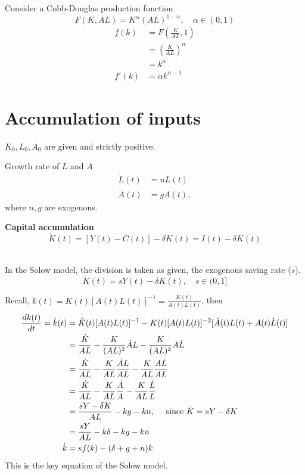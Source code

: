 \documentclass[12pt]{article}
\begin{document}
Consider a Cobb-Douglas production function
\begin{equation*}
F(K,AL) = K^{\alpha}(AL)^{1 - \alpha}, \quad \alpha \in (0,1)
\end{equation*}
\begin{align*}
f(k)&= F \left( \frac{K}{AL}, 1 \right) \\
&= \left( \frac{K}{AL} \right) ^{\alpha}\\
&= k ^{\alpha}\\
f'(k)&= \alpha k ^{\alpha - 1}
\end{align*}




\section{Accumulation of inputs}
$ K_0, L_0, A_0 $ are given and strictly positive.

Growth rate of $ L $ and $ A $
\begin{align*}
\dot{L}(t)&= nL(t)\\
\dot{A}(t)&= gA(t),
\end{align*}
where $ n,g $ are exogenous.

{\textbf {Capital accumulation}}
\begin{equation*}
		\dot{K}(t)  = [Y(t) - C(t)] - \delta K(t) = I(t) - \delta K(t)
\end{equation*}

\noindent{}\\


In the Solow model, the division is taken as given, the exogenous saving rate ($ s $).
\begin{equation*}
\dot{K}(t) = sY(t) - \delta K(t), \quad s \in (0,1]
\end{equation*}




Recall, $ k(t) = K(t)[A(t)L(t)]^{ - 1} = \frac{K(t)}{A(t)L(t)} $, then
\begin{align*}
\frac{dk(t)}{dt} = \dot{k}(t)
&= \dot{K}(t)[A(t)L(t)]^{ - 1} - K(t)[A(t)L(t)]^{ - 2}[\dot{A}(t)L(t) + A(t)\dot{L}(t)]
\\
&= \frac{\dot{K}}{AL} - \frac{K}{(AL)^{2}}\dot{A}L - \frac{K}{(AL)^{2}}A\dot{L}\\
&= \frac{\dot{K}}{AL} - \frac{K}{AL}\frac{\dot{A}L}{AL} - \frac{K}{AL}\frac{A\dot{L}}{
AL}\\
&= \frac{\dot{K}}{AL} - \frac{K}{AL}\frac{\dot{A}}{A} - \frac{K}{AL}\frac{\dot{L}}{L}\\
&= \frac{sY - \delta K}{AL} - kg - kn, \quad 
\text{ since $ \dot{K} =  sY - \delta K$ }\\
&= \frac{sY}{AL} - k \delta - kg - kn\\
\dot{k}&= sf(k) - (\delta + g + n)k
\end{align*}
This is the key equation of the Solow model.
\end{document}
